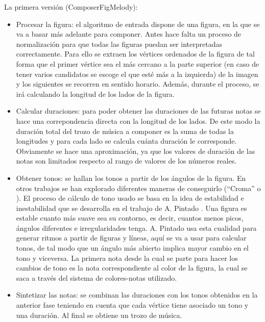 La primera versión (ComposerFigMelody):
\begin{itemize}
	\item Procesar la figura: el algoritmo de entrada dispone de una figura, en la que se va a basar más adelante para componer. Antes hace falta un proceso de normalización para que todas las figuras puedan ser interpretadas correctamente. Para ello se extraen los vértices ordenados de la figura de tal forma que el primer vértice sea el más cercano a la parte superior (en caso de tener varios candidatos se escoge el que esté más a la izquierda) de la imagen y los siguientes se recorren en sentido horario. Además, durante el proceso, se irá calculando la longitud de los lados de la figura.

	\item Calcular duraciones: para poder obtener las duraciones de las futuras notas se hace una correpondencia directa con la longitud de los lados. De este modo la duración total del trozo de música a componer es la suma de todas la longitudes y para cada lado se calcula cuánta duración le corresponde. Obviamente se hace una aproximación, ya que los valores de duración de las notas son limitados respecto al rango de valores de los números reales.

	\item Obtener tonos: se hallan los tonos a partir de los ángulos de la figura. En otros trabajos se han explorado diferentes maneras de conseguirlo (``Croma''\cite{bricksConvertsMusic} o \cite{ImageBaseComposition}). El proceso de cálculo de tono usado se basa en la idea de estabilidad e inestabilidad que se desarrolla en el trabajo de A. Pintado \cite{portutesis}. Una figura es estable cuanto más suave sea su contorno, es decir, cuantos menos picos, ángulos diferentes e irregularidades tenga. A. Pintado usa esta cualidad para generar ritmos a partir de figuras y líneas, aquí se va a usar para calcular tonos, de tal modo que un ángulo más abierto implica mayor cambio en el tono y viceversa. La primera nota desde la cual se parte para hacer los cambios de tono es la nota correspondiente al color de la figura, la cual se saca a través del sistema de colores-notas utilizado.

	\item Sintetizar las notas: se combinan las duraciones con los tonos obtenidos en la anterior fase teniendo en cuenta que cada vértice tiene asociado un tono y una duración. Al final se obtiene un trozo de música.

\end{itemize}

